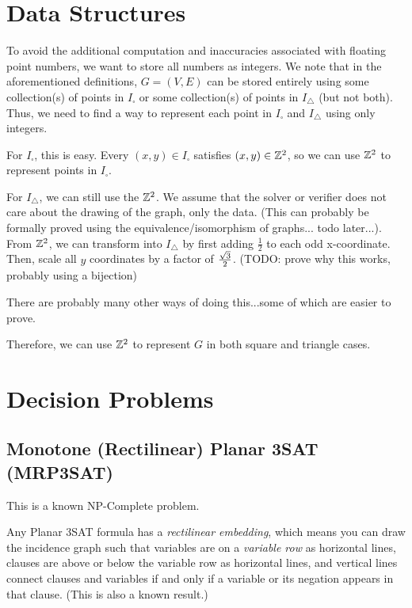\section{Data Structures}

To avoid the additional computation and inaccuracies associated with floating point numbers,
we want to store all numbers as integers. We note that in the aforementioned definitions, $G=(V,E)$ can be stored entirely using some collection(s) of points in $I_\square$ or some collection(s) of points in $I_\triangle$ (but not both).
Thus, we need to find a way to represent each point in $I_\square$ and $I_\triangle$ using only integers.

For $I_\square$, this is easy. Every $(x,y) \in I_{\square}$ satisfies $(x,y) \in \mathbb{Z}^2$, so we can use $\mathbb{Z}^2$ to represent points in $I_\square$.

For $I_\triangle$, we can still use the $\mathbb{Z}^2$. We assume that the solver or verifier does not care about the drawing of the graph, only the data. (This can probably be formally proved using the equivalence/isomorphism of graphs... todo later...).
From $\mathbb{Z}^2$, we can transform into $I_\triangle$ by first adding $\frac{1}{2}$ to each odd x-coordinate. Then, scale all $y$ coordinates by a factor of $\frac{\sqrt{3}}{2}$. (TODO: prove why this works, probably using a bijection)

There are probably many other ways of doing this...some of which are easier to prove.

Therefore, we can use $\mathbb{Z}^2$ to represent $G$ in both square and triangle cases.

\section{Decision Problems}

\subsection{Monotone (Rectilinear) Planar 3SAT (MRP3SAT)}

This is a known NP-Complete problem.

Any Planar 3SAT formula has a \textit{rectilinear embedding}, which means you can draw the incidence graph such that
variables are on a \textit{variable row} as horizontal lines,
clauses are above or below the variable row as horizontal lines,
and vertical lines connect clauses and variables if and only if a variable or its negation appears in that clause.
(This is also a known result.)

